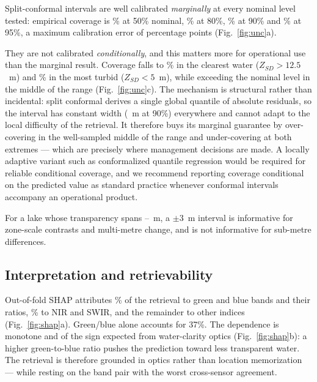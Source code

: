 \documentclass[preprint,review,12pt,authoryear]{elsarticle}
\begin{document}
Split-conformal intervals are well calibrated \emph{marginally} at every
nominal level tested: empirical coverage is \numConformalCovFiveZero\% at
50\% nominal, \numConformalCovEightZero\% at 80\%,
\numConformalCovNineZero\% at 90\% and \numConformalCovNineFive\% at 95\%,
a maximum calibration error of \numConformalMaxError{} percentage points
(Fig.~\ref{fig:unc}a).

They are not calibrated \emph{conditionally}, and this matters more for
operational use than the marginal result. Coverage falls to
\numConformalCovClearest\% in the clearest water ($Z_{SD}>12.5$~m) and
\numConformalCovTurbidest\% in the most turbid ($Z_{SD}<5$~m), while
exceeding the nominal level in the middle of the range
(Fig.~\ref{fig:unc}c). The mechanism is structural rather than incidental:
split conformal derives a single global quantile of absolute residuals, so
the interval has constant width (\numConformalWidthNineZero~m at 90\%)
everywhere and cannot adapt to the local difficulty of the retrieval. It
therefore buys its marginal guarantee by over-covering in the well-sampled
middle of the range and under-covering at both extremes --- which are
precisely where management decisions are made. A locally adaptive variant
such as conformalized quantile regression \citep{Romano2019} would be
required for reliable conditional coverage, and we recommend reporting
coverage conditional on the predicted value as standard practice whenever
conformal intervals accompany an operational product.

For a lake whose transparency spans \numSecchiMin--\numSecchiMax~m, a
$\pm3$~m interval is informative for zone-scale contrasts and multi-metre
change, and is not informative for sub-metre differences.



\subsection{Interpretation and retrievability}\label{sec:shap}

Out-of-fold SHAP attributes \numShapShareVerdeAzul\% of the retrieval to
green and blue bands and their ratios, \numShapShareNirSwir\% to NIR and
SWIR, and the remainder to other indices (Fig.~\ref{fig:shap}a). Green/blue
alone accounts for 37\%. The dependence is monotone and of the sign expected
from water-clarity optics (Fig.~\ref{fig:shap}b): a higher green-to-blue
ratio pushes the prediction toward less transparent water. The retrieval is
therefore grounded in optics rather than location memorization --- while
resting on the band pair with the worst cross-sensor agreement.
\end{document}
